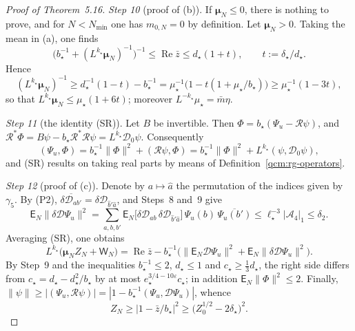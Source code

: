 \documentclass[11pt,letterpaper,reqno]{amsart}
\theoremstyle{definition}
\begin{document}
\begin{proof}[Proof of Theorem~5.16]
\emph{Step 10} (proof of (b)).
If $\boldsymbol\mu_N\le0$, there is nothing to prove, and for $N<N_{\min}$ one has $m_{0,N}=0$ by definition.
Let $\boldsymbol\mu_N>0$.
Taking the mean in (a), one finds
\begin{equation*}
\bigl(b_\star^{-1}+(L^{k_\star}\boldsymbol\mu_N)^{-1}\bigr)^{-1}\le\operatorname{Re}\bar z\le d_\star(1+t),\qquad t:=\delta_\star/d_\star .
\end{equation*}
Hence
\begin{equation*}
(L^{k_\star}\boldsymbol\mu_N)^{-1}\ge d_\star^{-1}(1-t)-b_\star^{-1}=\mu_\star^{-1}\bigl(1-t(1+\mu_\star/b_\star)\bigr)\ge\mu_\star^{-1}(1-3t),
\end{equation*}
so that $L^{k_\star}\boldsymbol\mu_N\le\mu_\star(1+6t)$;
moreover $L^{-k_\star}\mu_\star=\bar m\eta$.

\emph{Step 11} (the identity (SR)).
Let $B$ be invertible.
Then $\Phi=b_\star(\Psi_u-\mathcal R\psi)$, and $\mathcal R^*\Phi=\allowbreak B\psi-b_\star\mathcal R^*\mathcal R\psi=\allowbreak L^{k_\star}\mathcal D_0\psi$.
Consequently
\begin{equation*}
(\Psi_u,\Phi)=b_\star^{-1}\|\Phi\|^2+(\mathcal R\psi,\Phi)=b_\star^{-1}\|\Phi\|^2+L^{k_\star}(\psi,\mathcal D_0\psi),
\end{equation*}
and (SR) results on taking real parts by means of Definition~\ref{qcm:rg-operators}.

\emph{Step 12} (proof of (c)).
Denote by $a\mapsto\hat a$ the permutation of the indices given by $\gamma_5$.
By (P2), $\overline{\delta\mathcal D_{ab'}}=\allowbreak \delta\mathcal D_{\hat b'\hat a}$, and Steps~8 and~9 give
\begin{equation*}
\mathsf E_N\|\delta\mathcal D\Psi_u\|^2=\sum_{a,b,b'}\mathsf E_N\bigl[\delta\mathcal D_{ab}\,\delta\mathcal D_{\hat b'\hat a}\bigr]\,\Psi_u(b)\,\overline{\Psi_u(b')}\le\ell_\star^{-3}|\mathcal A_4|_1\le\delta_2 .
\end{equation*}
Averaging (SR), one obtains
\begin{equation*}
L^{k_\star}\bigl(\boldsymbol\mu_NZ_N+\mathsf W_N\bigr)=\operatorname{Re}\bar z-b_\star^{-1}\bigl(\|\mathsf E_N\mathcal D\Psi_u\|^2+\mathsf E_N\|\delta\mathcal D\Psi_u\|^2\bigr).
\end{equation*}
By Step~9 and the inequalities $b_\star^{-1}\le2$, $d_\star\le1$ and $c_\star\ge\frac13d_\star$, the right side differs from $c_\star=d_\star-d_\star^2/b_\star$ by at most $e_\star^{3/4-10\varepsilon}c_\star$;
in addition $\mathsf E_N\|\Phi\|^2\le2$.
Finally, $\|\psi\|\ge|(\Psi_u,\allowbreak \mathcal R\psi)|=\allowbreak |1-b_\star^{-1}(\Psi_u,\allowbreak \mathcal D\Psi_u)|$, whence
\begin{equation*}
Z_N\ge|1-\bar z/b_\star|^2\ge\bigl(Z_0^{1/2}-2\delta_\star\bigr)^2 .
\end{equation*}


\end{proof}
\end{document}
